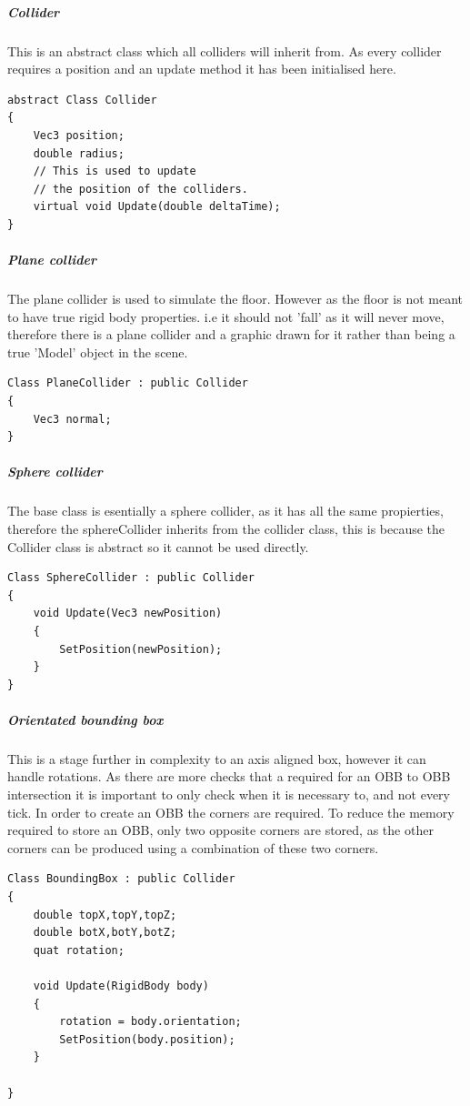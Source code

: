 \documentclass[conference,backref=page]{acmsiggraph}
\begin{document}
\subparagraph{Collider} \hfill

This is an abstract class which all colliders will inherit from. As every collider requires a position and an update method it has been initialised here.

\begin{lstlisting}
abstract Class Collider
{
	Vec3 position;
	double radius;
	// This is used to update
	// the position of the colliders.
	virtual void Update(double deltaTime); 
}
\end{lstlisting}

\subparagraph{Plane collider} \hfill

The plane collider is used to simulate the floor. However as the floor is not meant to have true rigid body properties. i.e it should not 'fall' as it will never move, therefore there is a plane collider and a graphic drawn for it rather than being a true 'Model' object in the scene.

\begin{lstlisting}
Class PlaneCollider : public Collider
{
	Vec3 normal;
}
\end{lstlisting}

\subparagraph{Sphere collider}  \hfill 

The base class is esentially a sphere collider, as it has all the same propierties, therefore the sphereCollider inherits from the collider class, this is because the Collider class is abstract so it cannot be used directly.
\begin{lstlisting}
Class SphereCollider : public Collider
{
	void Update(Vec3 newPosition)
	{
		SetPosition(newPosition);
	}
}
\end{lstlisting}

\subparagraph{Orientated bounding box}\hfill 

This is a stage further in complexity to an axis aligned box, however it can handle rotations. As there are more checks that a required for an OBB to OBB intersection it is important to only check when it is necessary to, and not every tick. In order to create an OBB the corners are required. To reduce the memory required to store an OBB, only two opposite corners are stored, as the other corners can be produced using a combination of these two corners.

\begin{lstlisting}
Class BoundingBox : public Collider
{
	double topX,topY,topZ;
	double botX,botY,botZ;
	quat rotation;
	
	void Update(RigidBody body)
	{
		rotation = body.orientation;
		SetPosition(body.position);
	}
	
}
\end{lstlisting}
\end{document}
